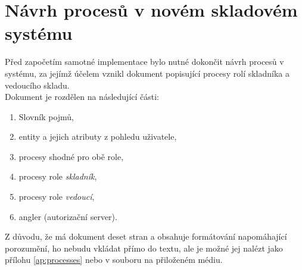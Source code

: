 \section{Návrh procesů v novém skladovém systému}

Před započetím samotné implementace bylo nutné dokončit návrh procesů v systému, za jejímž účelem vznikl dokument popisující procesy rolí skladníka a vedoucího skladu.\\
Dokument je rozdělen na následující části:
\begin{enumerate}
	\item Slovník pojmů,
	\item entity a jejich atributy z pohledu uživatele,
	\item procesy shodné pro obě role,
	\item procesy role \emph{skladník},
	\item procesy role \emph{vedoucí},
	\item angler (autorizační server).
\end{enumerate}
Z důvodu, že má dokument deset stran a obsahuje formátování napomáhající porozumění, ho nebudu vkládat přímo do textu, ale je možné jej nalézt jako přílohu \ref{ap:processes} nebo v souboru  na přiloženém médiu.
